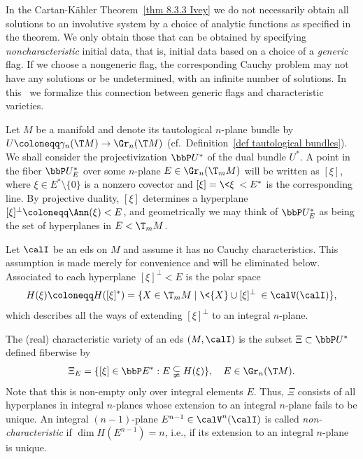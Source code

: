 In the Cartan-K\"ahler Theorem~\ref{thm 8.3.3 Ivey} we do not necessarily obtain all solutions to an involutive system by a choice of analytic functions as specified in the theorem. We only obtain those that can be obtained by specifying \emph{noncharacteristic} initial data, that is, initial data based on a choice of a \emph{generic} flag. If we choose a nongeneric flag, the corresponding Cauchy problem may not have any solutions or be undetermined, with an infinite number of solutions. In this \sect\ we formalize this connection between generic flags and characteristic varieties.

Let $M$ be a manifold and denote its tautological $n$-plane bundle by $U\coloneqq \gamma_n(\T M)\to \Gr_n(\T M)$ (cf.\ Definition~\ref{def tautological bundles}). We shall consider the projectivization $\bbP U^\ast$ of the dual bundle $U^\ast$. A point in the fiber $\bbP U^\ast_E$ over some $n$-plane $E\in \Gr_n(\T_m M)$ will be written as $[\xi]$, where $\xi\in E^\ast\setminus\{0\}$ is a nonzero covector and $[\xi]=\<\xi\><E^\ast$ is the corresponding line. By projective duality, $[\xi]$ determines a hyperplane $[\xi]^\perp\coloneqq \Ann(\xi)<E$, and geometrically we may think of $\bbP U^\ast_E$ as being the set of hyperplanes in $E<\T_m M$.

Let $\calI$ be an \gls{eds} on $M$ and assume it has no Cauchy characteristics. This assumption is made merely for convenience and will be eliminated below. Associated to each hyperplane $[\xi]^\perp<E$ is the polar space 
\[H(\xi)\coloneqq H([\xi]^\ast)=\{X\in\T_m M\mid \<\{X\}\cup [\xi]^\perp\>\in\calV(\calI)\},\]
which describes all the ways of extending $[\xi]^\perp$ to an integral $n$-plane.

\begin{defn}\label{def char variety eds}
    The (real) characteristic variety of an \gls{eds} $(M,\calI)$ is the subset $\Xi\subset \bbP U^\ast$ defined fiberwise by 
    \[\Xi_E=\{[\xi]\in \bbP E^\ast:E\subsetneqq H(\xi)\},\quad E\in\Gr_n(\T M).\label{eq char variety}\]
    Note that this is non-empty only over integral elements $E$. Thus, $\Xi$ consists of all hyperplanes in integral $n$-planes whose extension to an integral $n$-plane fails to be unique. An integral $(n-1)$-plane $E^{n-1}\in\calV^n(\calI)$ is called \emph{non-characteristic} if $\dim H(E^{n-1})=n$, i.e., if its extension to an integral $n$-plane is unique.
\end{defn}

